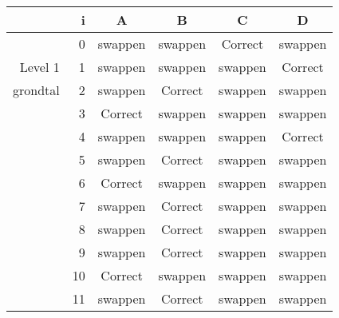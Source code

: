 \begin{tabular}{ rr| c|c|c|c}\hline\hline
     & i & \textbf{A} & \textbf{B} & \textbf{C} & \textbf{D}\\\hline

&0&swappen&swappen&Correct\cellcolor[gray]{0.6}&swappen\\
Level 1 & 1&swappen&swappen&swappen&Correct\cellcolor[gray]{0.6}\\
grondtal &2&swappen&Correct\cellcolor[gray]{0.6}&swappen&swappen\\
&3&Correct\cellcolor[gray]{0.6}&swappen&swappen&swappen\\
&4&swappen&swappen&swappen&Correct\cellcolor[gray]{0.6}\\
&5&swappen&Correct\cellcolor[gray]{0.6}&swappen&swappen\\
&6&Correct\cellcolor[gray]{0.6}&swappen&swappen&swappen\\
&7&swappen&Correct\cellcolor[gray]{0.6}&swappen&swappen\\
&8&swappen&Correct\cellcolor[gray]{0.6}&swappen&swappen\\
&9&swappen&Correct\cellcolor[gray]{0.6}&swappen&swappen\\
&10&Correct\cellcolor[gray]{0.6}&swappen&swappen&swappen\\
&11&swappen&Correct\cellcolor[gray]{0.6}&swappen&swappen\\
\hline\end{tabular}\par\ \newline

